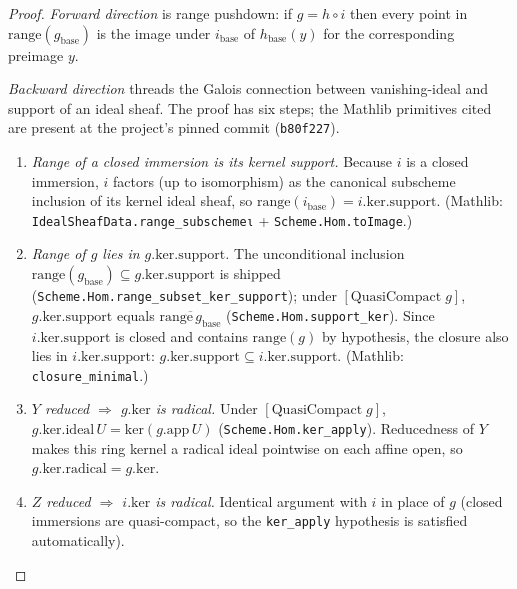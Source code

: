 \begin{proof}


\leanok
  \emph{Forward direction} is range pushdown: if \(g = h \circ i\)
  then every point in \(\mathrm{range}(g_{\text{base}})\) is the image
  under \(i_{\text{base}}\) of \(h_{\text{base}}(y)\) for the
  corresponding preimage \(y\).

  \emph{Backward direction} threads the Galois connection between
  vanishing-ideal and support of an ideal sheaf. The proof has six
  steps; the Mathlib primitives cited are present at the project's
  pinned commit (\texttt{b80f227}).

  \begin{enumerate}
  \item \emph{Range of a closed immersion is its kernel support.}
    Because \(i\) is a closed immersion, \(i\) factors (up to
    isomorphism) as the canonical subscheme inclusion of its kernel
    ideal sheaf, so
    \(\mathrm{range}(i_{\text{base}}) = i.\mathrm{ker}.\mathrm{support}\).
    (Mathlib:
    \texttt{IdealSheafData.range\_subschemeι} +
    \texttt{Scheme.Hom.toImage}.)
  \item \emph{Range of \(g\) lies in \(g.\mathrm{ker}.\mathrm{support}\).}
    The unconditional inclusion
    \(\mathrm{range}(g_{\text{base}}) \subseteq g.\mathrm{ker}.\mathrm{support}\)
    is shipped (\texttt{Scheme.Hom.range\_subset\_ker\_support}); under
    \([\mathrm{QuasiCompact}\;g]\), \(g.\mathrm{ker}.\mathrm{support}\)
    equals \(\overline{\mathrm{range}\,g_{\text{base}}}\)
    (\texttt{Scheme.Hom.support\_ker}). Since
    \(i.\mathrm{ker}.\mathrm{support}\) is closed and contains
    \(\mathrm{range}(g)\) by hypothesis, the closure also lies in
    \(i.\mathrm{ker}.\mathrm{support}\):
    \(g.\mathrm{ker}.\mathrm{support} \subseteq i.\mathrm{ker}.\mathrm{support}\).
    (Mathlib: \texttt{closure\_minimal}.)
  \item \emph{\(Y\) reduced \(\Rightarrow\) \(g.\mathrm{ker}\) is radical.}
    Under \([\mathrm{QuasiCompact}\;g]\),
    \(g.\mathrm{ker}.\mathrm{ideal}\,U = \mathrm{ker}(g.\mathrm{app}\,U)\)
    (\texttt{Scheme.Hom.ker\_apply}). Reducedness of \(Y\) makes this
    ring kernel a radical ideal pointwise on each affine open, so
    \(g.\mathrm{ker}.\mathrm{radical} = g.\mathrm{ker}\).
  \item \emph{\(Z\) reduced \(\Rightarrow\) \(i.\mathrm{ker}\) is
    radical.} Identical argument with \(i\) in place of \(g\)
    (closed immersions are quasi-compact, so the
    \texttt{ker\_apply} hypothesis is satisfied automatically).

\end{enumerate}
\end{proof}
